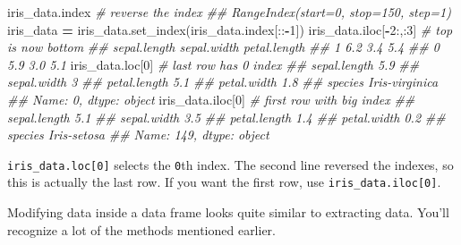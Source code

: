 \documentclass[
  12pt,
  krantz2]{krantz}
\makeatletter
\newenvironment{Shaded}{\begin{snugshade}}{\end{snugshade}}
\newcommand{\CommentTok}[1]{\textcolor[rgb]{0.37,0.37,0.37}{\textit{#1}}}
\newcommand{\DecValTok}[1]{\textcolor[rgb]{0.06,0.06,0.06}{#1}}
\newcommand{\NormalTok}[1]{#1}
\newcommand{\OperatorTok}[1]{\textcolor[rgb]{0.43,0.43,0.43}{\textbf{#1}}}
\newenvironment{kframe}{%
\medskip{}
\setlength{\fboxsep}{.8em}
 \def\at@end@of@kframe{}%
 \ifinner\ifhmode%
  \def\at@end@of@kframe{\end{minipage}}%
  \begin{minipage}{\columnwidth}%
 \fi\fi%
 \def\FrameCommand##1{\hskip\@totalleftmargin \hskip-\fboxsep
 \colorbox{shadecolor}{##1}\hskip-\fboxsep
     \hskip-\linewidth \hskip-\@totalleftmargin \hskip\columnwidth}%
 \MakeFramed {\advance\hsize-\width
   \@totalleftmargin\z@ \linewidth\hsize
   \@setminipage}}%
 {\par\unskip\endMakeFramed%
 \at@end@of@kframe}
\renewenvironment{Shaded}{\begin{kframe}}{\end{kframe}}
\makeatother
\begin{document}
\begin{Shaded}
\begin{Highlighting}[]
\NormalTok{iris\_data.index}
\CommentTok{\# reverse the index}
\CommentTok{\#\# RangeIndex(start=0, stop=150, step=1)}
\NormalTok{iris\_data }\OperatorTok{=}\NormalTok{ iris\_data.set\_index(iris\_data.index[::}\OperatorTok{{-}}\DecValTok{1}\NormalTok{]) }
\NormalTok{iris\_data.iloc[}\OperatorTok{{-}}\DecValTok{2}\NormalTok{:,:}\DecValTok{3}\NormalTok{] }\CommentTok{\# top is now bottom}
\CommentTok{\#\#    sepal.length  sepal.width  petal.length}
\CommentTok{\#\# 1           6.2          3.4           5.4}
\CommentTok{\#\# 0           5.9          3.0           5.1}
\NormalTok{iris\_data.loc[}\DecValTok{0}\NormalTok{] }\CommentTok{\# last row has 0 index}
\CommentTok{\#\# sepal.length               5.9}
\CommentTok{\#\# sepal.width                  3}
\CommentTok{\#\# petal.length               5.1}
\CommentTok{\#\# petal.width                1.8}
\CommentTok{\#\# species         Iris{-}virginica}
\CommentTok{\#\# Name: 0, dtype: object}
\NormalTok{iris\_data.iloc[}\DecValTok{0}\NormalTok{] }\CommentTok{\# first row with big index }
\CommentTok{\#\# sepal.length            5.1}
\CommentTok{\#\# sepal.width             3.5}
\CommentTok{\#\# petal.length            1.4}
\CommentTok{\#\# petal.width             0.2}
\CommentTok{\#\# species         Iris{-}setosa}
\CommentTok{\#\# Name: 149, dtype: object}
\end{Highlighting}
\end{Shaded}

\texttt{iris\_data.loc{[}0{]}} selects the \texttt{0}th index. The second line reversed the indexes, so this is actually the last row. If you want the first row, use \texttt{iris\_data.iloc{[}0{]}}.

Modifying data inside a data frame looks quite similar to extracting data. You'll recognize a lot of the methods mentioned earlier.
\end{document}
